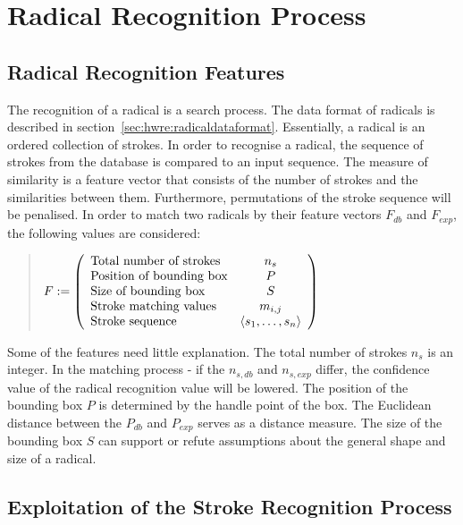 \section{Radical Recognition Process}
\label{sec:hwre:radicalrecognitionprocess}

\subsection{Radical Recognition Features}
\label{sec:hwre:radicalrecognitionfeatures}

The recognition of a radical is a search process. The data format of radicals is 
described in section~\ref{sec:hwre:radicaldataformat}.
Essentially, a radical is an ordered collection of strokes.
In order to recognise a radical, the sequence of strokes from the database
is compared to an input sequence.
The measure of similarity is a feature vector that consists of the number of
strokes and the similarities between them.
Furthermore, permutations of the stroke sequence will be penalised.
In order to match two radicals by their feature vectors \(F_{db} \) 
and \(F_{exp} \), the following values are considered:
\begin{quote}
\(
    F :=
    \left( 
    \begin {array} {l c} 
        \text{Total number of strokes} & n_{s} \\
        \text{Position of bounding box} & P \\
        \text{Size of bounding box} & S \\
        \text{Stroke matching values} & m_{i,j} \\ 
        \text{Stroke sequence} & \langle s_1,\ldots,s_n \rangle  \\
    \end {array} 
    \right)
\)
\end{quote}
Some of the features need little explanation. The total number of strokes 
\( n_{s} \) is an integer. In the matching process - if the \(n_{s,db} \) and
\(n_{s,exp} \) differ, the confidence value of the radical recognition value 
will be lowered. The position of the bounding box \(P\) is determined by the 
handle point of the box. The Euclidean distance between the \(P_{db}\) and 
\(P_{exp}\) serves as a distance measure. The size of the bounding box \(S\) 
can support or refute assumptions about the general shape and size of a radical.

\subsection[Exploitation of Stroke Recognition]
{Exploitation of the Stroke Recognition Process}
\label{sec:hwre:exploitationofstrokerecogition}

